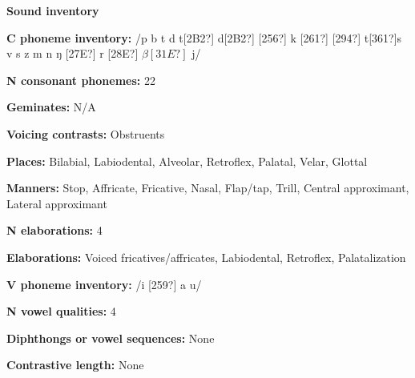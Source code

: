 \begin{styleBody}
\textbf{Sound inventory}
\end{styleBody}

\begin{styleBody}
\textbf{C phoneme inventory:} /p b t d t[2B2?] d[2B2?] [256?] k [261?] [294?] t[361?]s v s z m n ŋ [27E?] r [28E?] $\beta [31E?]$ j/
\end{styleBody}

\begin{styleBody}
\textbf{N consonant phonemes:} 22
\end{styleBody}

\begin{styleBody}
\textbf{Geminates:} N/A
\end{styleBody}

\begin{styleBody}
\textbf{Voicing contrasts: }Obstruents
\end{styleBody}

\begin{styleBody}
\textbf{Places: }Bilabial, Labiodental, Alveolar, Retroflex, Palatal, Velar, Glottal
\end{styleBody}

\begin{styleBody}
\textbf{Manners:} Stop, Affricate, Fricative, Nasal, Flap/tap, Trill, Central approximant, Lateral approximant
\end{styleBody}

\begin{styleBody}
\textbf{N elaborations:} 4
\end{styleBody}

\begin{styleBody}
\textbf{Elaborations:} Voiced fricatives/affricates, Labiodental, Retroflex, Palatalization
\end{styleBody}

\begin{styleBody}
\textbf{V phoneme inventory:} /i [259?] a u/
\end{styleBody}

\begin{styleBody}
\textbf{N vowel qualities:} 4
\end{styleBody}

\begin{styleBody}
\textbf{Diphthongs or vowel sequences:} None
\end{styleBody}

\begin{styleBody}
\textbf{Contrastive length:} None
\end{styleBody}

